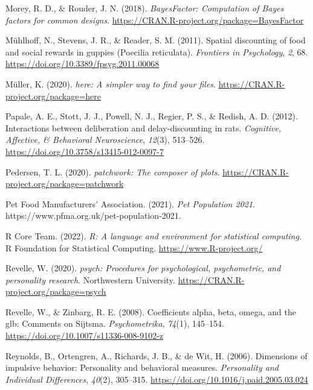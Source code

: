 \documentclass[
  pub,floatsintext]{apa6}
\newlength{\cslhangindent}
\newlength{\cslentryspacingunit} %
\newenvironment{CSLReferences}[2] %
 {%
  \setlength{\parindent}{0pt}
  \ifodd #1
  \let\oldpar\par
  \def\par{\hangindent=\cslhangindent\oldpar}
  \fi
  \setlength{\parskip}{#2\cslentryspacingunit}
 }%
 {}
\begin{document}
\begin{CSLReferences}{1}{0}
\leavevmode{}%
Morey, R. D., \& Rouder, J. N. (2018). \emph{BayesFactor: Computation of {Bayes} factors for common designs}. \url{https://CRAN.R-project.org/package=BayesFactor}

\leavevmode{}%
Mühlhoff, N., Stevens, J. R., \& Reader, S. M. (2011). Spatial discounting of food and social rewards in guppies ({Poecilia} reticulata). \emph{Frontiers in Psychology}, \emph{2}, 68. \url{https://doi.org/10.3389/fpsyg.2011.00068}

\leavevmode{}%
Müller, K. (2020). \emph{{here}: A simpler way to find your files}. \url{https://CRAN.R-project.org/package=here}

\leavevmode{}%
Papale, A. E., Stott, J. J., Powell, N. J., Regier, P. S., \& Redish, A. D. (2012). Interactions between deliberation and delay-discounting in rats. \emph{Cognitive, Affective, \& Behavioral Neuroscience}, \emph{12}(3), 513--526. \url{https://doi.org/10.3758/s13415-012-0097-7}

\leavevmode{}%
Pedersen, T. L. (2020). \emph{{patchwork}: The composer of plots}. \url{https://CRAN.R-project.org/package=patchwork}

\leavevmode{}%
Pet Food Manufacturers' Association. (2021). \emph{Pet {Population} 2021}. https://www.pfma.org.uk/pet-population-2021.

\leavevmode{}%
R Core Team. (2022). \emph{R: A language and environment for statistical computing}. R Foundation for Statistical Computing. \url{https://www.R-project.org/}

\leavevmode{}%
Revelle, W. (2020). \emph{{psych}: Procedures for psychological, psychometric, and personality research}. Northwestern University. \url{https://CRAN.R-project.org/package=psych}

\leavevmode{}%
Revelle, W., \& Zinbarg, R. E. (2008). Coefficients alpha, beta, omega, and the glb: {Comments} on {Sijtsma}. \emph{Psychometrika}, \emph{74}(1), 145--154. \url{https://doi.org/10.1007/s11336-008-9102-z}

\leavevmode{}%
Reynolds, B., Ortengren, A., Richards, J. B., \& de Wit, H. (2006). Dimensions of impulsive behavior: Personality and behavioral measures. \emph{Personality and Individual Differences}, \emph{40}(2), 305--315. \url{https://doi.org/10.1016/j.paid.2005.03.024}


\end{CSLReferences}
\end{document}
